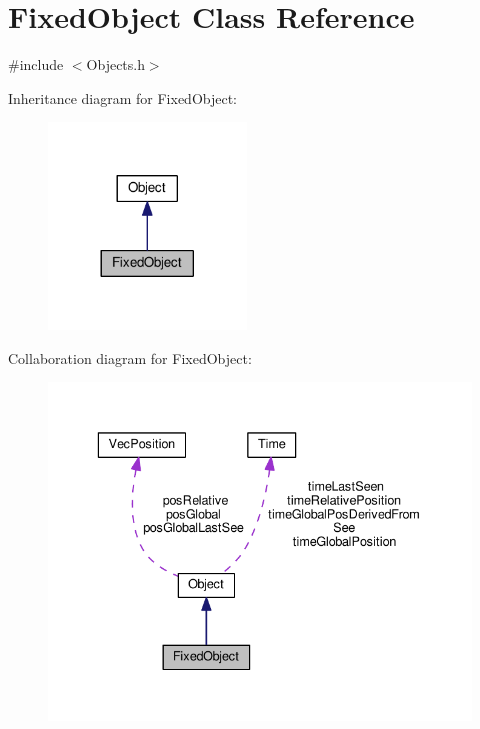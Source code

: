 \hypertarget{classFixedObject}{}\section{Fixed\+Object Class Reference}
\label{classFixedObject}


{\ttfamily \#include $<$Objects.\+h$>$}



Inheritance diagram for Fixed\+Object\+:
\nopagebreak
\begin{figure}[H]
\begin{center}
\leavevmode
\includegraphics[width=149pt]{classFixedObject__inherit__graph}
\end{center}
\end{figure}


Collaboration diagram for Fixed\+Object\+:
\nopagebreak
\begin{figure}[H]
\begin{center}
\leavevmode
\includegraphics[width=336pt]{classFixedObject__coll__graph}
\end{center}
\end{figure}
